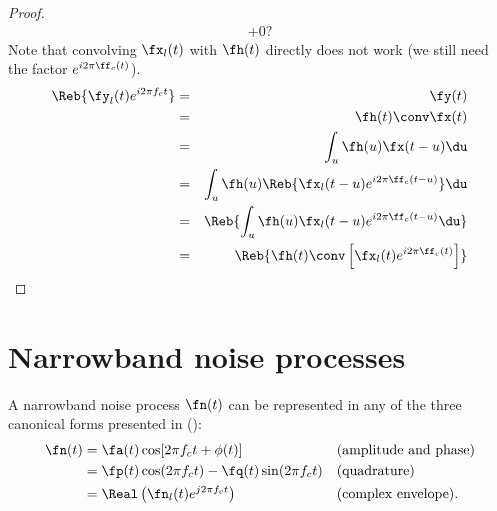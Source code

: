 \begin{proof}
\begin{eqnarray*}
        + 0 ?
\end{eqnarray*}
\attention
Note that convolving $\fx_l(t)$ with $\fh(t)$ directly does
not work (we still need the factor $e^{i2\pi \ff_c(t)}$).
\begin{eqnarray*}
   \Reb{ \fy_l(t)e^{i2\pi f_ct}}
     &=& \fy(t)
   \\&=& \fh(t) \conv \fx(t)
   \\&=& \int_u \fh(u)\fx(t-u)\du
   \\&=& \int_u \fh(u)
                \Reb{ \fx_l(t-u)e^{i2\pi \ff_c(t-u)}} \du
   \\&=& \Reb{ \int_u \fh(u)
                \fx_l(t-u)e^{i2\pi \ff_c(t-u)} \du }
   \\&=& \Reb{ \fh(t)\conv\left[\fx_l(t)e^{i2\pi \ff_c(t)}\right]}
\end{eqnarray*}
\end{proof}



\section{Narrowband noise processes}
A narrowband noise process $\fn(t)$ can be represented in any of the
three canonical forms presented in 
():
\begin{align*}
   \fn(t)
     &= \fa(t)\cos[2\pi f_ct + \phi(t)]
     && \text{(amplitude and phase)}
   \\&= \fp(t)\cos(2\pi f_ct) - \fq(t) \sin(2\pi f_c t)
     && \text{(quadrature)}
   \\&= \Real\left(\fn_l(t)e^{j2\pi f_ct}\right)
     && \text{(complex envelope).}
\end{align*}



